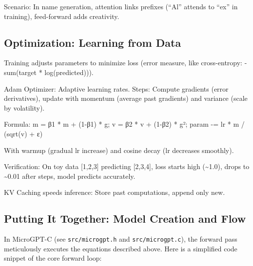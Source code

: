 \documentclass[
]{article}
\begin{document}
Scenario: In name generation, attention links prefixes (``Al'' attends
to ``ex'' in training), feed-forward adds creativity.

\subsection{Optimization: Learning from
Data}\label{optimization-learning-from-data}

Training adjusts parameters to minimize loss (error measure, like
cross-entropy: -sum(target * log(predicted))).

Adam Optimizer: Adaptive learning rates. Steps: Compute gradients (error
derivatives), update with momentum (average past gradients) and variance
(scale by volatility).

Formula: m = β1 * m + (1-β1) * g; v = β2 * v + (1-β2) * g²; param -= lr
* m / (sqrt(v) + ε)

With warmup (gradual lr increase) and cosine decay (lr decreases
smoothly).

Verification: On toy data {[}1,2,3{]} predicting {[}2,3,4{]}, loss
starts high (\textasciitilde1.0), drops to \textasciitilde0.01 after
steps, model predicts accurately.

KV Caching speeds inference: Store past computations, append only new.

\subsection{Putting It Together: Model Creation and
Flow}\label{putting-it-together-model-creation-and-flow}

In MicroGPT-C (see \texttt{src/microgpt.h} and \texttt{src/microgpt.c}),
the forward pass meticulously executes the equations described above.
Here is a simplified code snippet of the core forward loop:
\end{document}
